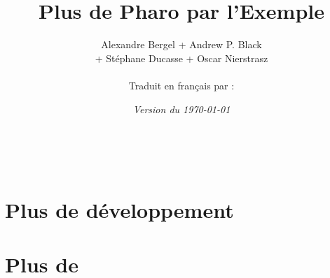 \documentclass[a4paper,10pt,twoside]{book}
\begin{document}
\frontmatter
\setcounter{page}{1}
\pagestyle{headings}
\author{
  Alexandre Bergel\quad
+	Andrew P. Black\\[1ex]
+	St\'ephane Ducasse\quad
+	Oscar Nierstrasz\quad
  
	\\[4ex]
Traduit en fran\c{c}ais par :\\[2ex]
	}
\title{\Huge\bf Plus de Pharo par l'Exemple\\[1ex]} %
\numdate
{}
\date{\emph{Version du \today}}
\maketitle
~ %


\pagestyle{newheadings}
\tableofcontents
\sloppy %

\mainmatter
\part{Plus de développement}
\pagestyle{headings}

% 
% 
% 

\part{Plus de \frameworks}
% 

\end{document}
